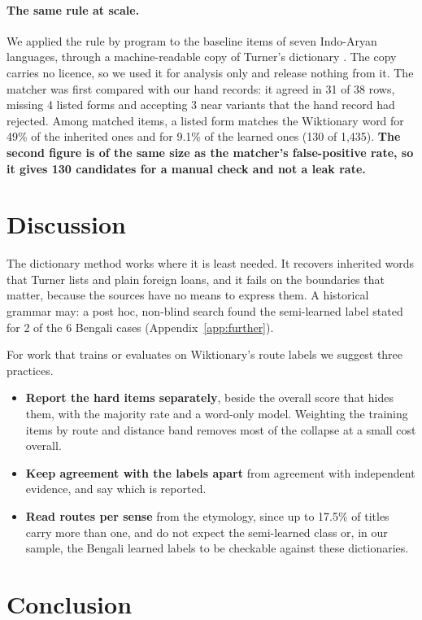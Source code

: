 \documentclass[11pt]{article}
\begin{document}
\paragraph{The same rule at scale.} We applied the rule by program to the baseline items of seven Indo-Aryan languages, through a machine-readable copy of Turner's dictionary \citep{arora2023jambu}. The copy carries no licence, so we used it for analysis only and release nothing from it. The matcher was first compared with our hand records: it agreed in 31 of 38 rows, missing 4 listed forms and accepting 3 near variants that the hand record had rejected. Among matched items, a listed form matches the Wiktionary word for 49\% of the inherited ones and for 9.1\% of the learned ones (130 of 1,435). \textbf{The second figure is of the same size as the matcher's false-positive rate, so it gives 130 candidates for a manual check and not a leak rate.}

\section{Discussion}

The dictionary method works where it is least needed. It recovers inherited words that Turner lists and plain foreign loans, and it fails on the boundaries that matter, because the sources have no means to express them. A historical grammar may: a post hoc, non-blind search found the semi-learned label stated for 2 of the 6 Bengali cases (Appendix~\ref{app:further}).

For work that trains or evaluates on Wiktionary's route labels we suggest three practices.
\begin{itemize}
\item \textbf{Report the hard items separately}, beside the overall score that hides them, with the majority rate and a word-only model. Weighting the training items by route and distance band removes most of the collapse at a small cost overall.
\item \textbf{Keep agreement with the labels apart} from agreement with independent evidence, and say which is reported.
\item \textbf{Read routes per sense} from the etymology, since up to 17.5\% of titles carry more than one, and do not expect the semi-learned class or, in our sample, the Bengali learned labels to be checkable against these dictionaries.
\end{itemize}

\section{Conclusion}
\end{document}
